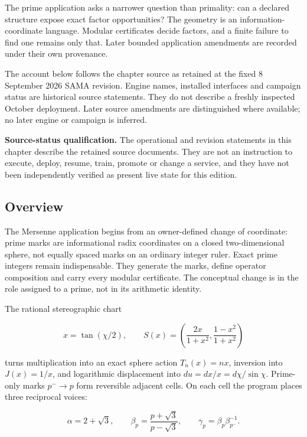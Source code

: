 \label{viii-ch10-prime-coordinates-and-exact-mersenne-factors}

The prime application asks a narrower question than primality: can a
declared structure expose exact factor opportunities? The geometry is an
information-coordinate language. Modular certificates decide factors,
and a finite failure to find one remains only that. Later bounded
application amendments are recorded under their own provenance.

The account below follows the chapter source as retained at the fixed 8
September 2026 SAMA revision. Engine names, installed interfaces and
campaign status are historical source statements. They do not describe a
freshly inspected October deployment. Later source amendments are
distinguished where available; no later engine or campaign is inferred.

\textbf{Source-status qualification.} The operational and revision
statements in this chapter describe the retained source documents. They
are not an instruction to execute, deploy, resume, train, promote or
change a service, and they have not been independently verified as
present live state for this edition.

\subsection{Overview}\label{viii-ch10-overview}

The Mersenne application begins from an owner-defined change of
coordinate: prime marks are informational radix coordinates on a closed
two-dimensional sphere, not equally spaced marks on an ordinary integer
ruler. Exact prime integers remain indispensable. They generate the
marks, define operator composition and carry every modular certificate.
The conceptual change is in the role assigned to a prime, not in its
arithmetic identity.

The rational stereographic chart

\[
x=\tan(\chi/2),
\qquad
S(x)=\left(\frac{2x}{1+x^2},\frac{1-x^2}{1+x^2}\right)
\]

turns multiplication into an exact sphere action \(T_n(x)=nx\),
inversion into \(J(x)=1/x\), and logarithmic displacement into
\(du=dx/x=d\chi/\sin\chi\). Prime-only marks \(p^-\to p\) form
reversible adjacent cells. On each cell the program places three
reciprocal voices:

\[
\alpha=2+\sqrt3,
\qquad
\beta_p=\frac{p+\sqrt3}{p-\sqrt3},
\qquad
\gamma_p=\beta_p\beta_{p^-}^{-1}.
\]

